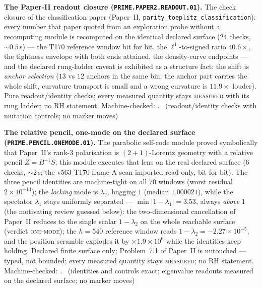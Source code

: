 \documentclass[11pt,a4paper]{article}
\theoremstyle{definition}
\begin{document}
\par\smallskip\noindent\textbf{The Paper-II readout closure
(\texttt{PRIME.PAPER2.READOUT.01}).}
The check closure of the classification paper (Paper~II,
\texttt{parity\_toeplitz\_classification}): every number that paper
quoted from an exploration probe without a recomputing module is
recomputed on the identical declared surface ($24$ checks,
${\sim}0.5$\,s) --- the T170 reference window bit for bit, the
$\ell^{1}$-to-signed ratio $40.6\times$, the tightness envelope with
both ends attained, the density-curve endpoints --- and the declared
rung-ladder caveat is exhibited as a structure fact: the shift is
\emph{anchor selection} ($13$ vs $12$ anchors in the same bin; the
anchor part carries the whole shift, curvature transport is small and
a wrong curvature is $11.9\times$ louder). Pure readout/identity
checks; every measured quantity stays \textsc{measured} with its rung
ladder; no RH statement. Machine-checked:
.
\mE\ (readout/identity checks with mutation controls; no marker moves)
\par\smallskip

\par\smallskip\noindent\textbf{The relative pencil, one-mode on the declared
surface (\texttt{PRIME.PENCIL.ONEMODE.01}).}
The parabolic self-code module proved symbolically that Paper~II's rank-3
polarisation is $(2{+}1)$-Lorentz geometry with a relative pencil
$Z=B^{-1}S$; this module executes that lens on the real declared surface
($6$ checks, ${\sim}2$\,s; the v563 T170 frame-A scan imported read-only,
bit for bit). The three pencil identities are machine-tight on all $70$
windows (worst residual $2\times10^{-14}$); the \emph{locking} mode is
$\lambda_2$, hugging $1$ (median $1.000021$), while the spectator
$\lambda_1$ stays uniformly separated --- $\min|1-\lambda_1|=3.53$, always
\emph{above} $1$ (the motivating review guessed below): the two-dimensional
cancellation of Paper~II reduces to the single scalar $1-\lambda_2$ on the
whole reachable surface (verdict \textsc{one-mode}); the $h=540$ reference
window reads $1-\lambda_2=-2.27\times10^{-5}$, and the position scramble
explodes it by $\times1.9\times10^{6}$ while the identities keep holding.
Declared finite surface only; Problem~7.1 of Paper~II is untouched ---
typed, not bounded; every measured quantity stays \textsc{measured}; no RH
statement. Machine-checked:
.
\mE\ (identities and controls exact; eigenvalue readouts measured on the
declared surface; no marker moves)
\par\smallskip
\end{document}
